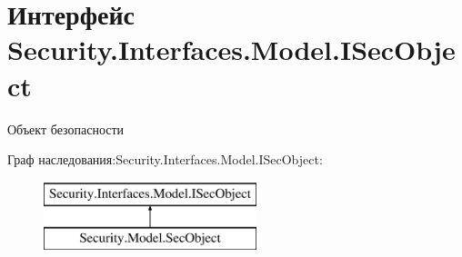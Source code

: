 \hypertarget{interface_security_1_1_interfaces_1_1_model_1_1_i_sec_object}{}\section{Интерфейс Security.\+Interfaces.\+Model.\+I\+Sec\+Object}
\label{interface_security_1_1_interfaces_1_1_model_1_1_i_sec_object}


Объект безопасности  


Граф наследования\+:Security.\+Interfaces.\+Model.\+I\+Sec\+Object\+:\begin{figure}[H]
\begin{center}
\leavevmode
\includegraphics[height=2.000000cm]{d6/d35/interface_security_1_1_interfaces_1_1_model_1_1_i_sec_object}
\end{center}
\end{figure}
